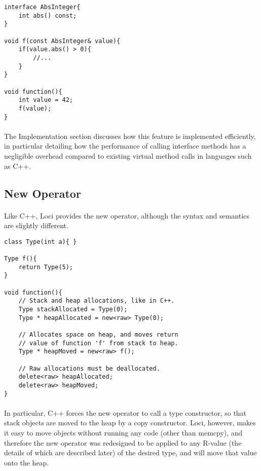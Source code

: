 \documentclass[12pt,twoside,notitlepage]{report}
\begin{document}
\begin{lstlisting}
interface AbsInteger{
	int abs() const;
}

void f(const AbsInteger& value){
	if(value.abs() > 0){
		//...
	}
}

void function(){
	int value = 42;
	f(value);
}
\end{lstlisting}

\paragraph{}
The Implementation section discusses how this feature is implemented efficiently, in particular detailing how the performance of calling interface methods has a negligible overhead compared to existing virtual method calls in languages such as C++.

\clearpage

\subsection{New Operator}

\paragraph{}
Like C++, Loci provides the new operator, although the syntax and semantics are slightly different.


\begin{lstlisting}
class Type(int a){ }

Type f(){
	return Type(5);
}

void function(){
	// Stack and heap allocations, like in C++.
	Type stackAllocated = Type(0);
	Type * heapAllocated = new<raw> Type(0);
	
	// Allocates space on heap, and moves return
	// value of function 'f' from stack to heap.
	Type * heapMoved = new<raw> f();
	
	// Raw allocations must be deallocated.
	delete<raw> heapAllocated;
	delete<raw> heapMoved;
}
\end{lstlisting}


\paragraph{}
In particular, C++ forces the new operator to call a type constructor, so that stack objects are moved to the heap by a copy constructor. Loci, however, makes it easy to move objects without running any code (other than memcpy), and therefore the new operator was redesigned to be applied to any R-value (the details of which are described later) of the desired type, and will move that value onto the heap.
\end{document}
